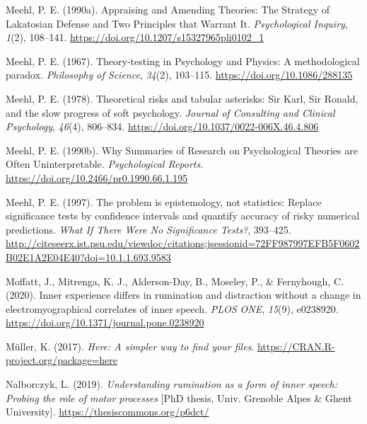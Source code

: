 \documentclass[
  english,
  man, donotrepeattitle,mask,floatsintext]{apa6}
\newlength{\cslhangindent}
\newlength{\cslentryspacingunit} %
\newenvironment{CSLReferences}[2] %
 {%
  \setlength{\parindent}{0pt}
  \ifodd #1
  \let\oldpar\par
  \def\par{\hangindent=\cslhangindent\oldpar}
  \fi
  \setlength{\parskip}{#2\cslentryspacingunit}
 }%
 {}
\begin{document}
\begin{CSLReferences}{1}{0}
\leavevmode{}%
Meehl, P. E. (1990a). Appraising and {Amending Theories}: The {Strategy} of {Lakatosian Defense} and {Two Principles} that {Warrant It}. \emph{Psychological Inquiry}, \emph{1}(2), 108--141. \url{https://doi.org/10.1207/s15327965pli0102_1}

\leavevmode{}%
Meehl, P. E. (1967). Theory-testing in {Psychology} and {Physics}: A methodological paradox. \emph{Philosophy of Science}, \emph{34}(2), 103--115. \url{https://doi.org/10.1086/288135}

\leavevmode{}%
Meehl, P. E. (1978). Theoretical risks and tabular asterisks: Sir {Karl}, {Sir Ronald}, and the slow progress of soft psychology. \emph{Journal of Consulting and Clinical Psychology}, \emph{46}(4), 806--834. \url{https://doi.org/10.1037/0022-006X.46.4.806}

\leavevmode{}%
Meehl, P. E. (1990b). Why {Summaries} of {Research} on {Psychological Theories} are {Often Uninterpretable}. \emph{Psychological Reports}. \url{https://doi.org/10.2466/pr0.1990.66.1.195}

\leavevmode{}%
Meehl, P. E. (1997). The problem is epistemology, not statistics: Replace significance tests by confidence intervals and quantify accuracy of risky numerical predictions. \emph{What If There Were No Significance Tests?}, 393--425. \url{http://citeseerx.ist.psu.edu/viewdoc/citations;jsessionid=72FF987997EFB5F0602B02E1A2E04E40?doi=10.1.1.693.9583}

\leavevmode{}%
Moffatt, J., Mitrenga, K. J., Alderson-Day, B., Moseley, P., \& Fernyhough, C. (2020). Inner experience differs in rumination and distraction without a change in electromyographical correlates of inner speech. \emph{PLOS ONE}, \emph{15}(9), e0238920. \url{https://doi.org/10.1371/journal.pone.0238920}

\leavevmode{}%
Müller, K. (2017). \emph{Here: A simpler way to find your files}. \url{https://CRAN.R-project.org/package=here}

\leavevmode{}%
Nalborczyk, L. (2019). \emph{Understanding rumination as a form of inner speech: Probing the role of motor processes} {[}PhD thesis, {Univ. Grenoble Alpes \& Ghent University}{]}. \url{https://thesiscommons.org/p6dct/}


\end{CSLReferences}
\end{document}
